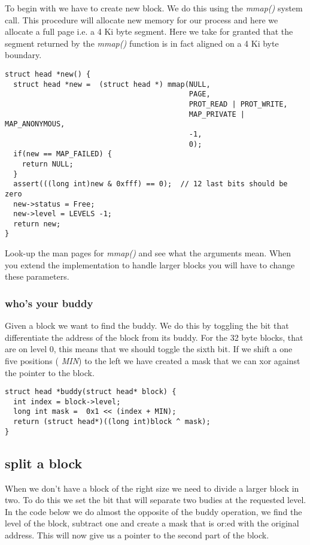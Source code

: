 \documentclass[a4paper,11pt]{article}
\begin{document}
To begin with we have to create new block. We do this using the 
  {\em mmap()} system call. This procedure will allocate new memory for our
process and here we allocate a full page i.e. a 4 Ki byte segment. Here we
take for granted that the segment returned by the {\em mmap()} function
is in fact aligned on a 4 Ki byte boundary. 


\begin{lstlisting}
struct head *new() {
  struct head *new =  (struct head *) mmap(NULL,
                                           PAGE,
                                           PROT_READ | PROT_WRITE,
                                           MAP_PRIVATE | MAP_ANONYMOUS,
                                           -1,
                                           0);
  if(new == MAP_FAILED) {
    return NULL;
  }
  assert(((long int)new & 0xfff) == 0);  // 12 last bits should be zero 
  new->status = Free;
  new->level = LEVELS -1;
  return new;
}
\end{lstlisting}

Look-up the man pages for {\em mmap()} and see what the arguments mean. When
you extend the implementation to handle larger blocks you will have to
change these parameters.

\subsubsection*{who's your buddy}

Given a block we want to find the buddy. We do this by
toggling the bit that differentiate the address of the block from its
buddy. For the 32 byte blocks, that are on level $0$, this means that
we should toggle the sixth bit. If we shift a one five positions ({\em
  MIN}) to the left we have created a mask that we can xor against the
pointer to the block.

\begin{lstlisting}
struct head *buddy(struct head* block) {
  int index = block->level;
  long int mask =  0x1 << (index + MIN);
  return (struct head*)((long int)block ^ mask);
}
\end{lstlisting}

\subsection*{split a block}

When we don't have a block of the right size we need to divide a
larger block in two. To do this we set the bit that will separate two
budies at the requested level. In the code below we do almost the
opposite of the buddy operation, we find the level of the block,
subtract one and create a mask that is or:ed with the original
address. This will now give us a pointer to the second part of the
block.
\end{document}
